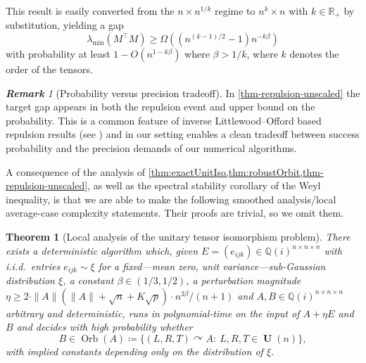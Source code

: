 \documentclass[11pt]{article}
\numberwithin{equation}{section}
\newtheorem{theorem}{Theorem}[section]
\theoremstyle{remark}
\newtheorem{remark}{\bf Remark}[section]
\DeclareMathOperator{\Orb}{Orb}
\DeclareMathOperator{\Unitary}{\textbf{U}}
\newcommand{\R}{\mathbb{R}}
\newcommand{\MinEigenvalueGap}{\lambda_{\mathrm{min}}}
\newcommand{\QQ}{\mathbb{Q}}
\begin{document}
This result is easily converted from the $n \times n^{1/k}$ regime to $n^k \times n$ with $k \in \R_+$ by substitution, yielding a gap
\begin{equation}\label{eq-gap-useable}
    \MinEigenvalueGap(M^\top  M) \geq \Omega((n^{(k - 1)/2} - 1)n^{- k\beta})
\end{equation}
with probability at least $1 - O(n^{1 - k\beta})$ where $\beta > 1/k$, where $k$ denotes the order of the tensors.

\begin{remark}[Probability versus precision tradeoff]
    In \cref{thm-repulsion-unscaled} the target gap appears in both the repulsion event and upper bound on the probability. This is a common feature of inverse Littlewood--Offord based repulsion results (see \cite{nguyen2015randommatricestailbounds, christoffersen2025gaps, han2025simplicity}) and in our setting enables a clean tradeoff between success probability and the precision demands of our numerical algorithms.
\end{remark}

A consequence of the analysis of \cref{thm:exactUnitIso,thm:robustOrbit,thm-repulsion-unscaled}, as well as the spectral stability corollary of the Weyl inequality, is that we are able to make the following smoothed analysis/local average-case complexity statements. Their proofs are trivial, so we omit them.

\begin{theorem}[Local analysis of the unitary tensor isomorphism problem]\label{thm:exactUnitIsoLocal}
There exists a deterministic algorithm which, given $E=(e_{ijk})\in\QQ(i)^{n\times n\times n}$ with i.i.d.\ entries $e_{ijk} \sim \xi$ for a fixed---mean zero, unit variance---sub-Gaussian distribution $\xi$, a constant $\beta \in (1/3, 1/2)$, a perturbation magnitude $\eta \geq 2 \cdot \|A\|(\|A\| + \sqrt{n} + K\sqrt{p})\cdot n^{3\beta}/(n + 1)$ and $A, B\in\QQ(i)^{n\times n\times n}$ arbitrary and deterministic, runs in polynomial-time on the input of $A + \eta E$ and $B$ and decides with high probability whether
\[
B\in\Orb(A)\coloneqq \{(L,R,T)\curvearrowright A:\ L,R,T\in \Unitary(n)\},
\]
with implied constants depending only on the distribution of $\xi$.
\end{theorem}
\end{document}
